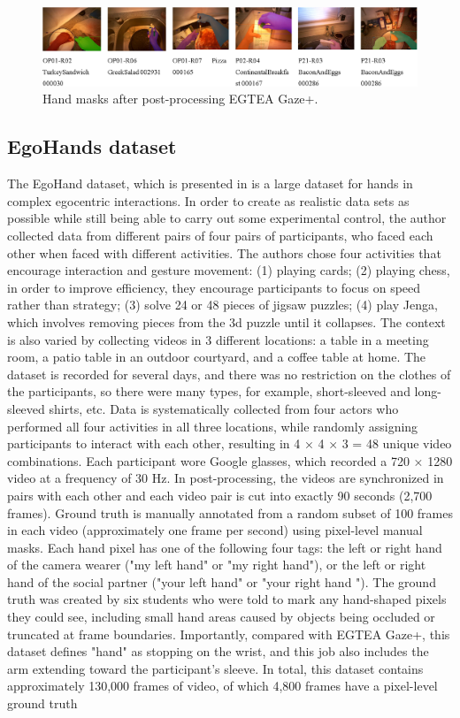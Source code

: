 \vspace*{-\baselineskip}
\begin{figure}
	\centerline{\includegraphics[width=1\linewidth]{Figs/postGTEA.png}}
	\caption{Hand masks after post-processing EGTEA Gaze+.}
	\label{fig:postgtea}
\end{figure}
\subsection{EgoHands dataset}
The EgoHand dataset, which is presented in \cite{10.1109/ICCV.2015.226} is a large dataset for hands in complex egocentric interactions. In order to create as realistic data sets as possible while still being able to carry out some experimental control, the author collected data from different pairs of four pairs of participants, who faced each other when faced with different activities. The authors chose four activities that encourage interaction and gesture movement: (1) playing cards; (2) playing chess, in order to improve efficiency, they encourage participants to focus on speed rather than strategy; (3) solve 24 or 48 pieces of jigsaw puzzles; (4) play Jenga, which involves removing pieces from the 3d puzzle until it collapses. The context is also varied by collecting videos in 3 different locations: a table in a meeting room, a patio table in an outdoor courtyard, and a coffee table at home. The dataset is recorded for several days, and there was no restriction on the clothes of the participants, so there were many types, for example, short-sleeved and long-sleeved shirts, etc. Data is systematically collected from four actors who performed all four activities in all three locations, while randomly assigning participants to interact with each other, resulting in 4 × 4 × 3 = 48 unique video combinations. Each participant wore Google glasses, which recorded a 720 × 1280 video at a frequency of 30 Hz. In post-processing, the videos are synchronized in pairs with each other and each video pair is cut into exactly 90 seconds (2,700 frames). Ground truth is manually annotated from a random subset of 100 frames in each video (approximately one frame per second) using pixel-level manual masks. Each hand pixel has one of the following four tags: the left or right hand of the camera wearer ("my left hand" or "my right hand"), or the left or right hand of the social partner ("your left hand" or "your right hand "). The ground truth was created by six students who were told to mark any hand-shaped pixels they could see, including small hand areas caused by objects being occluded or truncated at frame boundaries. Importantly, compared with EGTEA Gaze+, this dataset defines "hand" as stopping on the wrist, and this job also includes the arm extending toward the participant's sleeve. In total, this dataset contains approximately 130,000 frames of video, of which 4,800 frames have a pixel-level ground truth 